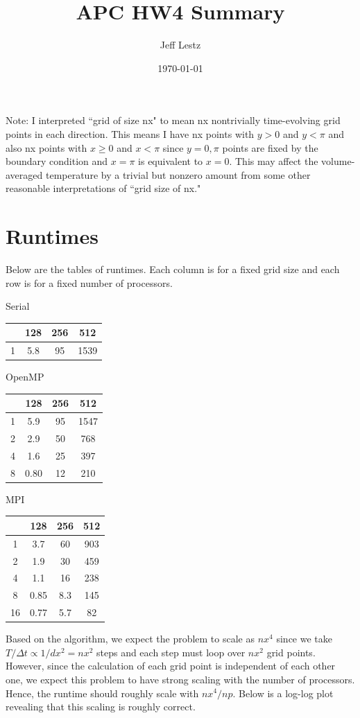 \documentclass[11pt]{article}
\title{APC HW4 Summary}
\author{Jeff Lestz}
\date{\today}
\theoremstyle{plain}
\theoremstyle{definition}
\begin{document}
\maketitle

Note: I interpreted ``grid of size nx" to mean nx nontrivially time-evolving grid points in each direction. This means I have nx points with $y > 0$ and $y < \pi$ and also nx points with $x \geq 0$ and $x < \pi$ since $y=0,\pi$ points are fixed by the boundary condition and $x=\pi$ is equivalent to $x=0$. This may affect the volume-averaged temperature by a trivial but nonzero amount from some other reasonable interpretations of ``grid size of nx." 

\section{Runtimes} 

Below are the tables of runtimes. Each column is for a fixed grid size and each row is for a fixed number of processors. 

Serial 

\begin{tabular}{ c | c | c | c } 
 & 128 & 256 & 512 \\ 
 \hline
1 & 5.8 & 95 & 1539 \\ 
\end{tabular}

OpenMP

\begin{tabular}{ c | c | c | c } 
 & 128 & 256 & 512 \\ 
 \hline
1 & 5.9 & 95 & 1547 \\ 
2 & 2.9 & 50 & 768 \\ 
4 & 1.6 & 25 & 397 \\ 
8 & 0.80 & 12 & 210 \\ 
\end{tabular}

MPI

\begin{tabular}{ c | c | c | c } 
 & 128 & 256 & 512 \\ 
 \hline
1 & 3.7 & 60 & 903 \\ 
2 & 1.9 & 30 & 459 \\ 
4 & 1.1 & 16 & 238 \\ 
8 & 0.85 & 8.3 & 145 \\ 
16 & 0.77 & 5.7 & 82 \\ 
\end{tabular}

Based on the algorithm, we expect the problem to scale as $nx^4$ since we take $T/\Delta t \propto 1/dx^2 = nx^2$ steps and each step must loop over $nx^2$ grid points. However, since the calculation of each grid point is independent of each other one, we expect this problem to have strong scaling with the number of processors. Hence, the runtime should roughly scale with $nx^4/np$. Below is a log-log plot revealing that this scaling is roughly correct. 
\end{document}
